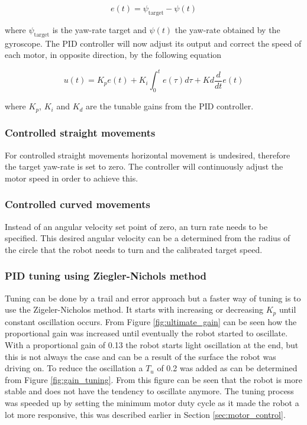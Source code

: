 \begin{equation}
	e(t) = \psi_{\text{target}} - \psi(t)
\end{equation}

\noindent
where $\psi_{\text{target}}$ is the yaw-rate target and $\psi(t)$ the yaw-rate obtained by the gyroscope.
The PID controller will now adjust its output and correct the speed of each motor, in opposite direction, by the following equation

\begin{equation}
u(t) = K_{p}e(t) + K_{i} \int_{0}^{t}e(\tau)d\tau + Kd\frac{d}{dt}e(t)
\end{equation}

\noindent
where $K_{p}$, $K_{i}$ and $K_{d}$ are the tunable gains from the PID controller.

\subsubsection{Controlled straight movements}

For controlled straight movements horizontal movement is undesired, therefore the target yaw-rate is set to zero.
The controller will continuously adjust the motor speed in order to achieve this.

\subsubsection{Controlled curved movements} 

Instead of an angular velocity set point of zero, an turn rate needs to be specified.
This desired angular velocity can be a determined from the radius of the circle that the robot needs to turn and the calibrated target speed.

\subsubsection{PID tuning using Ziegler-Nichols method}


Tuning can be done by a trail and error approach but a faster way of tuning is to use the Zigeler-Nicholos method.
It starts with increasing or decreasing $K_{p}$ until constant oscillation occurs.
From Figure \ref{fig:ultimate_gain} can be seen how the proportional gain was increased until eventually the robot started to oscillate.
With a proportional gain of 0.13 the robot starts light oscillation at the end, but this is not always the case and can be a result of the surface the robot was driving on.
To reduce the oscillation a $T_{u}$ of 0.2 was added as can be determined from Figure \ref{fig:gain_tuning}.
From this figure can be seen that the robot is more stable and does not have the tendency to oscillate anymore.
The tuning process was speeded up by setting the minimum motor duty cycle as it made the robot a lot more responsive, this was described earlier in Section \ref{sec:motor_control}.

